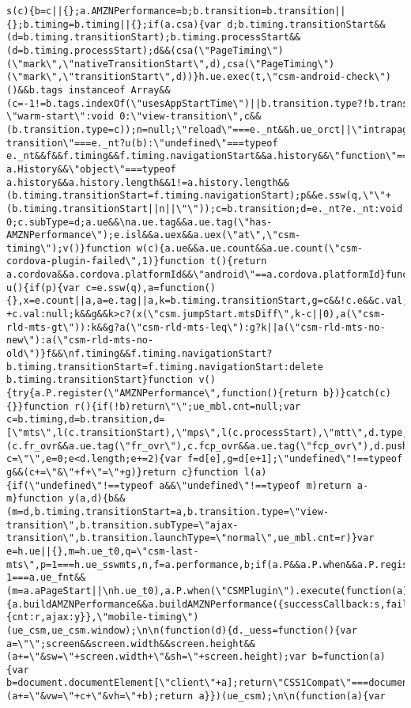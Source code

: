 \documentclass[
]{article}
\begin{document}
\begin{verbatim}
s(c){b=c||{};a.AMZNPerformance=b;b.transition=b.transition||{};b.timing=b.timing||{};if(a.csa){var d;b.timing.transitionStart&&(d=b.timing.transitionStart);b.timing.processStart&&(d=b.timing.processStart);d&&(csa(\"PageTiming\")(\"mark\",\"nativeTransitionStart\",d),csa(\"PageTiming\")(\"mark\",\"transitionStart\",d))}h.ue.exec(t,\"csm-android-check\")()&&b.tags instanceof Array&&(c=-1!=b.tags.indexOf(\"usesAppStartTime\")||b.transition.type?!b.transition.type&&-1<\nb.tags.indexOf(\"usesAppStartTime\")?\"warm-start\":void 0:\"view-transition\",c&&(b.transition.type=c));n=null;\"reload\"===e._nt&&h.ue_orct||\"intrapage-transition\"===e._nt?u(b):\"undefined\"===typeof e._nt&&f&&f.timing&&f.timing.navigationStart&&a.history&&\"function\"===typeof a.History&&\"object\"===typeof a.history&&a.history.length&&1!=a.history.length&&(b.timing.transitionStart=f.timing.navigationStart);p&&e.ssw(q,\"\"+(b.timing.transitionStart||n||\"\"));c=b.transition;d=e._nt?e._nt:void 0;c.subType=d;a.ue&&\na.ue.tag&&a.ue.tag(\"has-AMZNPerformance\");e.isl&&a.uex&&a.uex(\"at\",\"csm-timing\");v()}function w(c){a.ue&&a.ue.count&&a.ue.count(\"csm-cordova-plugin-failed\",1)}function t(){return a.cordova&&a.cordova.platformId&&\"android\"==a.cordova.platformId}function u(){if(p){var c=e.ssw(q),a=function(){},x=e.count||a,a=e.tag||a,k=b.timing.transitionStart,g=c&&!c.e&&c.val;n=c=g?+c.val:null;k&&g&&k>c?(x(\"csm.jumpStart.mtsDiff\",k-c||0),a(\"csm-rld-mts-gt\")):k&&g?a(\"csm-rld-mts-leq\"):g?k||a(\"csm-rld-mts-no-new\"):a(\"csm-rld-mts-no-old\")}f&&\nf.timing&&f.timing.navigationStart?b.timing.transitionStart=f.timing.navigationStart:delete b.timing.transitionStart}function v(){try{a.P.register(\"AMZNPerformance\",function(){return b})}catch(c){}}function r(){if(!b)return\"\";ue_mbl.cnt=null;var c=b.timing,d=b.transition,d=[\"mts\",l(c.transitionStart),\"mps\",l(c.processStart),\"mtt\",d.type,\"mtst\",d.subType,\"mtlt\",d.launchType];a.ue&&a.ue.tag&&(c.fr_ovr&&a.ue.tag(\"fr_ovr\"),c.fcp_ovr&&a.ue.tag(\"fcp_ovr\"),d.push(\"fr_ovr\",l(c.fr_ovr),\"fcp_ovr\",l(c.fcp_ovr)));\nfor(var c=\"\",e=0;e<d.length;e+=2){var f=d[e],g=d[e+1];\"undefined\"!==typeof g&&(c+=\"&\"+f+\"=\"+g)}return c}function l(a){if(\"undefined\"!==typeof a&&\"undefined\"!==typeof m)return a-m}function y(a,d){b&&(m=d,b.timing.transitionStart=a,b.transition.type=\"view-transition\",b.transition.subType=\"ajax-transition\",b.transition.launchType=\"normal\",ue_mbl.cnt=r)}var e=h.ue||{},m=h.ue_t0,q=\"csm-last-mts\",p=1===h.ue_sswmts,n,f=a.performance,b;if(a.P&&a.P.when&&a.P.register)return 1===a.ue_fnt&&(m=a.aPageStart||\nh.ue_t0),a.P.when(\"CSMPlugin\").execute(function(a){a.buildAMZNPerformance&&a.buildAMZNPerformance({successCallback:s,failCallback:w})}),{cnt:r,ajax:y}},\"mobile-timing\")(ue_csm,ue_csm.window);\n\n(function(d){d._uess=function(){var a=\"\";screen&&screen.width&&screen.height&&(a+=\"&sw=\"+screen.width+\"&sh=\"+screen.height);var b=function(a){var b=document.documentElement[\"client\"+a];return\"CSS1Compat\"===document.compatMode&&b||document.body[\"client\"+a]||b},c=b(\"Width\"),b=b(\"Height\");c&&b&&(a+=\"&vw=\"+c+\"&vh=\"+b);return a}})(ue_csm);\n\n(function(a){var 
\end{verbatim}
\end{document}
